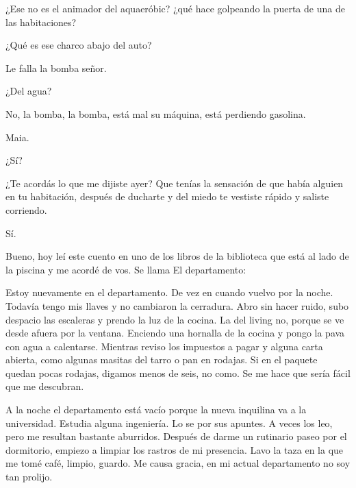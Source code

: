 \documentclass[12pt,twoside,openright,a5paper]{book}
\begin{document}
\vspace{0.5cm}
\hrulefill\hspace{0.2cm} \decofourleft\decofourright \hspace{0.2cm} \hrulefill
\vspace{0.5cm}

¿Ese no es el animador del aquaeróbic? ¿qué hace golpeando la puerta
de una de las habitaciones?


\vspace{0.5cm}
\hrulefill\hspace{0.2cm} \decofourleft\decofourright \hspace{0.2cm} \hrulefill
\vspace{0.5cm}

¿Qué es ese charco abajo del auto?

Le falla la bomba señor.

¿Del agua?

No, la bomba, la bomba, está mal su máquina, está perdiendo gasolina.


\vspace{0.5cm}
\hrulefill\hspace{0.2cm} \decofourleft\decofourright \hspace{0.2cm} \hrulefill
\vspace{0.5cm}

Maia.

¿Sí?

¿Te acordás lo que me dijiste ayer? Que tenías la sensación de que había
alguien en tu habitación, después de ducharte y del miedo te vestiste
rápido y saliste corriendo.

Sí.

Bueno, hoy leí este cuento en uno de los libros de la biblioteca que está
al lado de la piscina y me acordé de vos. Se llama El departamento:

Estoy nuevamente en el departamento. De vez en cuando vuelvo por la
noche. Todavía tengo mis llaves y no cambiaron la cerradura. Abro sin hacer
ruido, subo despacio las escaleras y prendo la luz de la cocina. La del
living no, porque se ve desde afuera por la ventana. Enciendo una hornalla
de la cocina y pongo la pava con agua a calentarse. Mientras reviso los
impuestos a pagar y alguna carta abierta, como algunas masitas del tarro
o pan en rodajas. Si en el paquete quedan pocas rodajas, digamos menos de
seis, no como. Se me hace que sería fácil que me descubran.

A la noche el departamento está vacío porque la nueva inquilina va a la
universidad. Estudia alguna ingeniería. Lo se por sus apuntes. A veces los
leo, pero me resultan bastante aburridos. Después de darme un rutinario
paseo por el dormitorio, empiezo a limpiar los rastros de mi presencia. Lavo
la taza en la que me tomé café, limpio, guardo. Me causa gracia, en mi
actual departamento no soy tan prolijo.
\end{document}
